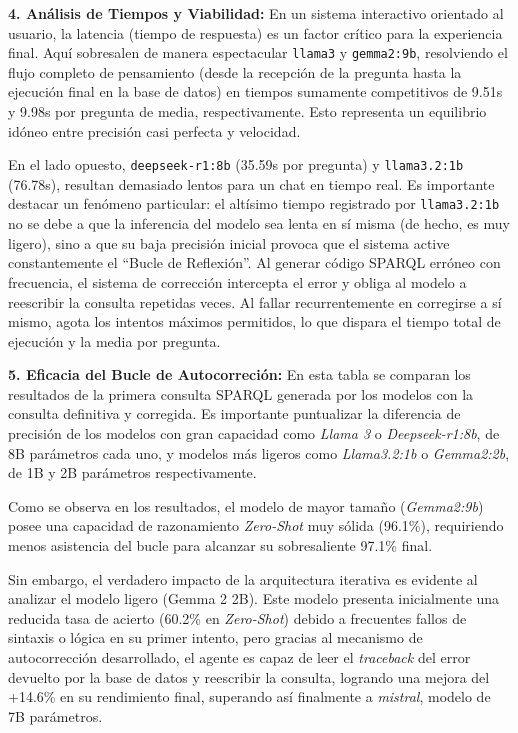 \textbf{4. Análisis de Tiempos y Viabilidad:} En un sistema interactivo orientado al usuario, la latencia (tiempo de respuesta) es un factor crítico para la experiencia final. Aquí sobresalen de manera espectacular \texttt{llama3} y \texttt{gemma2:9b}, resolviendo el flujo completo de pensamiento (desde la recepción de la pregunta hasta la ejecución final en la base de datos) en tiempos sumamente competitivos de 9.51s y 9.98s por pregunta de media, respectivamente. Esto representa un equilibrio idóneo entre precisión casi perfecta y velocidad.

En el lado opuesto, \texttt{deepseek-r1:8b} (35.59s por pregunta) y \texttt{llama3.2:1b} (76.78s), resultan demasiado lentos para un chat en tiempo real. Es importante destacar un fenómeno particular: el altísimo tiempo registrado por \texttt{llama3.2:1b} no se debe a que la inferencia del modelo sea lenta en sí misma (de hecho, es muy ligero), sino a que su baja precisión inicial provoca que el sistema active constantemente el ``Bucle de Reflexión''. Al generar código SPARQL erróneo con frecuencia, el sistema de corrección intercepta el error y obliga al modelo a reescribir la consulta repetidas veces. Al fallar recurrentemente en corregirse a sí mismo, agota los intentos máximos permitidos, lo que dispara el tiempo total de ejecución y la media por pregunta.

\textbf{5. Eficacia del Bucle de Autocorreción:} En esta tabla se comparan los resultados de la primera consulta SPARQL generada por los modelos con la consulta definitiva y corregida. Es importante puntualizar la diferencia de precisión de los modelos con gran capacidad como \textit{Llama 3} o \textit{Deepseek-r1:8b}, de 8B parámetros cada uno, y modelos más ligeros como \textit{Llama3.2:1b} o \textit{Gemma2:2b}, de 1B y 2B parámetros respectivamente.

Como se observa en los resultados, el modelo de mayor tamaño (\textit{Gemma2:9b}) posee una capacidad de razonamiento \textit{Zero-Shot} muy sólida (96.1\%), requiriendo menos asistencia del bucle para alcanzar su sobresaliente 97.1\% final.

Sin embargo, el verdadero impacto de la arquitectura iterativa es evidente al analizar el modelo ligero (Gemma 2 2B). Este modelo presenta inicialmente una reducida tasa de acierto (60.2\% en \textit{Zero-Shot}) debido a frecuentes fallos de sintaxis o lógica en su primer intento, pero gracias al mecanismo de autocorrección desarrollado, el agente es capaz de leer el \textit{traceback} del error devuelto por la base de datos y reescribir la consulta, logrando una mejora del +14.6\% en su rendimiento final, superando así finalmente a \textit{mistral}, modelo de 7B parámetros.

